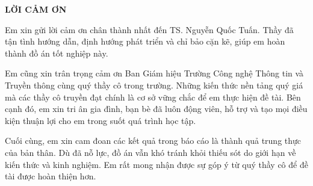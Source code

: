 \documentclass[../main.tex]{subfiles}
\begin{document}
\begin{center}
    \Large{\textbf{LỜI CẢM ƠN}}\\
\end{center}
\vspace{1cm}
Em xin gửi lời cảm ơn chân thành nhất đến TS. Nguyễn Quốc Tuấn. Thầy đã tận tình hướng dẫn, định hướng phát triển và chỉ bảo cặn kẽ, giúp em hoàn thành đồ án tốt nghiệp này.

Em cũng xin trân trọng cảm ơn Ban Giám hiệu Trường Công nghệ Thông tin và Truyền thông cùng quý thầy cô trong trường. Những kiến thức nền tảng quý giá mà các thầy cô truyền đạt chính là cơ sở vững chắc để em thực hiện đề tài. Bên cạnh đó, em xin tri ân gia đình, bạn bè đã luôn động viên, hỗ trợ và tạo mọi điều kiện thuận lợi cho em trong suốt quá trình học tập.

Cuối cùng, em xin cam đoan các kết quả trong báo cáo là thành quả trung thực của bản thân. Dù đã nỗ lực, đồ án vẫn khó tránh khỏi thiếu sót do giới hạn về kiến thức và kinh nghiệm. Em rất mong nhận được sự góp ý từ quý thầy cô để đề tài được hoàn thiện hơn.
\end{document}

